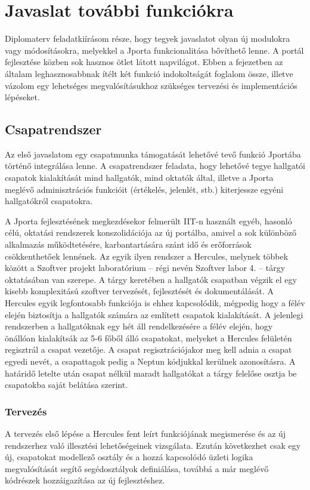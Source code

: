\chapter{Javaslat további funkciókra}\label{chapter:features}
Diplomaterv feladatkiírásom része, hogy tegyek javaslatot olyan új modulokra vagy módosításokra, melyekkel a Jporta funkcionalitása bővíthető lenne.
A portál fejlesztése közben sok hasznos ötlet látott napvilágot.
Ebben a fejezetben az általam leghasznosabbnak ítélt két funkció indokoltságát foglalom össze, illetve vázolom egy lehetséges megvalósításukhoz szükséges tervezési és implementációs lépéseket.

\section{Csapatrendszer}
Az első javaslatom egy csapatmunka támogatását lehetővé tevő funkció Jportába történő integrálása lenne.
A csapatrendszer feladata, hogy lehetővé tegye hallgatói csapatok kialakítását mind hallgatók, mind oktatók által, illetve a Jporta meglévő adminisztrációs funkcióit (értékelés, jelenlét, stb.) kiterjessze egyéni hallgatókról csapatokra.

A Jporta fejlesztésének megkezdésekor felmerült IIT-n használt egyéb, hasonló célú, oktatási rendszerek konszolidációja az új portálba, amivel a sok különböző alkalmazás működtetésére, karbantartására szánt idő és erőforrások csökkenthetőek lennének.
Az egyik ilyen rendszer a Hercules, melynek többek között a Szoftver projekt laboratórium -- régi nevén Szoftver labor 4. -- tárgy oktatásában van szerepe.
A tárgy keretében a hallgatók csapatban végzik el egy kisebb komplexitású szoftver tervezését, fejlesztését és dokumentálását.
A Hercules egyik legfontosabb funkciója is ehhez kapcsolódik, mégpedig hogy a félév elején biztosítja a hallgatók számára az említett csapatok kialakítását.
A jelenlegi rendszerben a hallgatóknak egy hét áll rendelkezésére a félév elején, hogy önállóan kialakítsák az 5-6 főből álló csapatokat, melyeket a Hercules felületén regisztrál a csapat vezetője.
A csapat regisztrációjakor meg kell adnia a csapat egyedi nevét, a csapattagok pedig a Neptun kódjukkal kerülnek azonosításra.
A határidő letelte után csapat nélkül maradt hallgatókat a tárgy felelőse osztja be csapatokba saját belátása szerint. 

\subsection{Tervezés}
A tervezés első lépése a Hercules fent leírt funkciójának megismerése és az új rendszerhez való illesztési lehetőségeinek vizsgálata.
Ezután következhet csak egy új, csapatokat modellező osztály és a hozzá kapcsolódó üzleti logika megvalósítását segítő segédosztályok definiálása, továbbá a már meglévő kódrészek hozzáigazítása az új fejlesztéshez.

